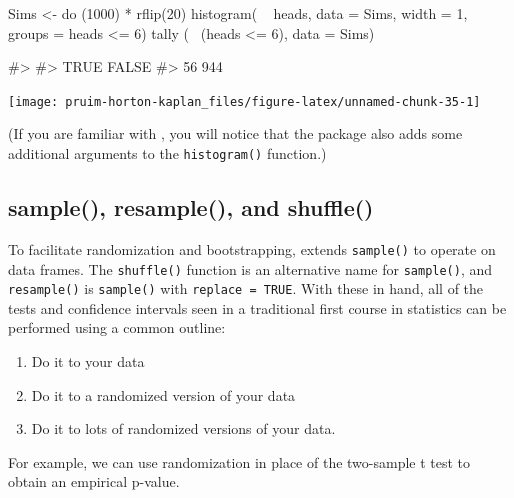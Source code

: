 \begin{Schunk}
\begin{Sinput}
Sims <- do (1000) * rflip(20)
histogram( ~ heads, data = Sims, width = 1, groups = heads <= 6)
tally ( ~(heads <= 6), data = Sims)
\end{Sinput}
\begin{Soutput}
#> 
#>  TRUE FALSE 
#>    56   944
\end{Soutput}


\begin{center}\texttt{[image: pruim-horton-kaplan\_files/figure-latex/unnamed-chunk-35-1]} \end{center}

\end{Schunk}

\noindent
(If you are familiar with , you will notice that the
 package also adds some additional arguments to the
\texttt{histogram()} function.)

\subsection{sample(), resample(), and
shuffle()}\label{sample-resample-and-shuffle}

To facilitate randomization and bootstrapping,  extends
\texttt{sample()} to operate on data frames. The \texttt{shuffle()}
function is an alternative name for \texttt{sample()}, and
\texttt{resample()} is \texttt{sample()} with \texttt{replace\ =\ TRUE}.
With these in hand, all of the tests and confidence intervals seen in a
traditional first course in statistics can be performed using a common
outline:

\begin{enumerate}
\def\labelenumi{\arabic{enumi}.}
\tightlist
\item
  Do it to your data
\item
  Do it to a randomized version of your data
\item
  Do it to lots of randomized versions of your data.
\end{enumerate}

For example, we can use randomization in place of the two-sample t test
to obtain an empirical p-value.

